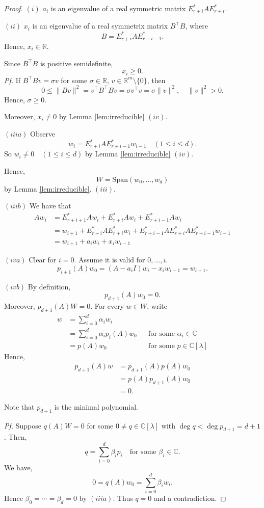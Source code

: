 \documentclass[
]{book}
\theoremstyle{definition}
\theoremstyle{definition}
\theoremstyle{definition}
\theoremstyle{definition}
\theoremstyle{remark}
\begin{document}
\begin{proof}
\((i)\) \(a_i\) is an eigenvalue of a real symmetric matrix \(E_{r+i}^*AE^*_{r+i}\).

\((ii)\) \(x_i\) is an eigenvalue of a real symmetrix matrix \(B^\top B\), where
\[B = E^*_{r+i}AE^*_{r+i-1}.\]
Hence, \(x_i\in \mathbb{R}\).

Since \(B^\top B\) is positive semidefinite,
\[x_i \geq 0.\]
\emph{Pf.} If \(B^\top Bv = \sigma v\) for some \(\sigma \in \mathbb{R}\), \(v\in \mathbb{R}^m \setminus \{0\}\), then
\[0\leq \|Bv\|^2 = v^\top B^\top Bv = \sigma v^\top v = \sigma \|v\|^2, \quad \|v\|^2 >0.\]
Hence, \(\sigma \geq 0\).

Moreover, \(x_i\neq 0\) by Lemma \ref{lem:irreducible} \((iv)\).

\((iiia)\) Observe
\[w_i = E^*_{r+i}AE^*_{r+i-1}w_{i-1} \quad (1\leq i \leq d).\]
So \(w_i \neq 0 \quad (1\leq i \leq d)\) by Lemma \ref{lem:irreducible} \((iv)\).

Hence,
\[W = \mathrm{Span}(w_0, \ldots, w_d)\]
by Lemma \ref{lem:irreducible}. \((iii)\).

\((iiib)\) We have that
\begin{align}
Aw_i & = E^*_{r+i+1}Aw_i + E_{r+i}^*Aw_i + E^*_{r+i-1}Aw_i\\
& = w_{i+1} + E^*_{r+i}AE^*_{r+i}w_i + E^*_{r+i-1}AE^*_{r+i}AE^*_{r+i-1}w_{i-1}\\
& = w_{i+1} + a_iw_{i} + x_iw_{i-1}
\end{align}

\((iva)\) Clear for \(i=0\). Assume it is valid for \(0, \ldots, i\).
\[p_{i+1}(A)w_0 = (A-a_iI)w_i - x_iw_{i-1} = w_{i+1}.\]

\((ivb)\) By definition,
\[p_{d+1}(A)w_0 = 0.\]
Moreover, \(p_{d+1}(A)W = 0\). For every \(w\in W\), write
\begin{align}
w & = \sum_{i=0}^d \alpha_i w_i \\
& = \sum_{i=0}^d \alpha_i p_i(A)w_0 && \text{for some }\alpha_i\in\mathbb{C}\\
& = p(A)w_0 && \text{for some }p\in \mathbb{C}[\lambda]
\end{align}
Hence,
\begin{align}
p_{d+1}(A)w & = p_{d+1}(A)p(A)w_0\\
& = p(A)p_{d+1}(A)w_0\\
& = 0.
\end{align}

Note that \(p_{d+1}\) is the minimal polynomial.

\emph{Pf.}
Suppose \(q(A)W = 0\) for some \(0\neq q\in \mathbb{C}[\lambda]\) with \(\deg q < \deg p_{d+1} = d+1\).
Then,
\[q = \sum_{i=0}^d\beta_ip_i \quad \text{for some }\beta_i\in \mathbb{C}.\]
We have,
\[0  = q(A)w_0  = \sum_{i=0}^d \beta_iw_i.\]
Hence \(\beta_0 = \cdots = \beta_d = 0\) by \((iiia)\). Thus \(q = 0\) and a contradiction.
\end{proof}
\end{document}
